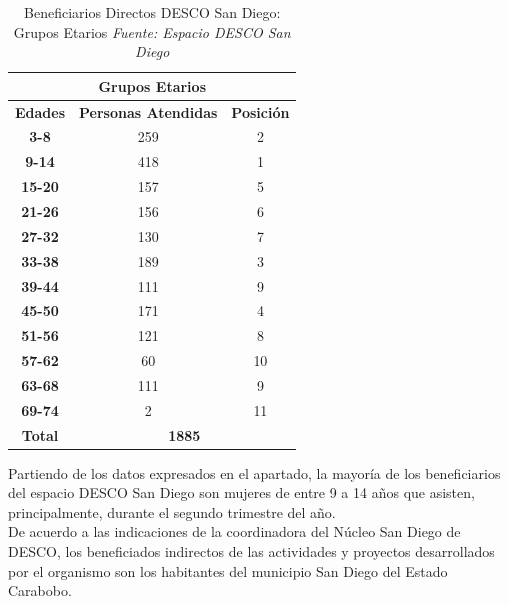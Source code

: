 \documentclass[11pt, a4paper, twosides]{report}
\begin{document}
\begin{table}[h]
	\centering
	\begin{tabular}{|c|c|c|}
		\hline
		\multicolumn{3}{|c|}{\cellcolor{gray75} \textbf{Grupos Etarios}}                     \\ \hline
		\textbf{Edades} & \textbf{Personas Atendidas} & \textbf{Posición} \\ \hline
		\textbf{3-8}    & 259                         & 2                 \\ \hline
		\textbf{9-14}   & 418                         & 1                 \\ \hline
		\textbf{15-20}  & 157                         & 5                 \\ \hline
		\textbf{21-26}  & 156                         & 6                 \\ \hline
		\textbf{27-32}  & 130                         & 7                 \\ \hline
		\textbf{33-38}  & 189                         & 3                 \\ \hline
		\textbf{39-44}  & 111                         & 9                 \\ \hline
		\textbf{45-50}  & 171                         & 4                 \\ \hline
		\textbf{51-56}  & 121                         & 8                 \\ \hline
		\textbf{57-62}  & 60                          & 10                \\ \hline
		\textbf{63-68}  & 111                         & 9                 \\ \hline
		\textbf{69-74}  & 2                           & 11                \\ \hline
		\textbf{Total}  & \multicolumn{2}{c|}{\textbf{1885}}              \\ \hline
	\end{tabular}
	\caption{Beneficiarios Directos DESCO San Diego: Grupos Etarios \textit{Fuente: Espacio DESCO San Diego}}
	\label{tabla3}
\end{table}
Partiendo de los datos expresados en el apartado, la mayoría de los beneficiarios del espacio DESCO San Diego son mujeres de entre 9 a 14 años que asisten, principalmente, durante el segundo trimestre del año.\\
De acuerdo a las indicaciones de la coordinadora del Núcleo San Diego de DESCO, los beneficiados indirectos de las actividades y proyectos desarrollados por el organismo son los habitantes del municipio San Diego del Estado Carabobo.
\end{document}
